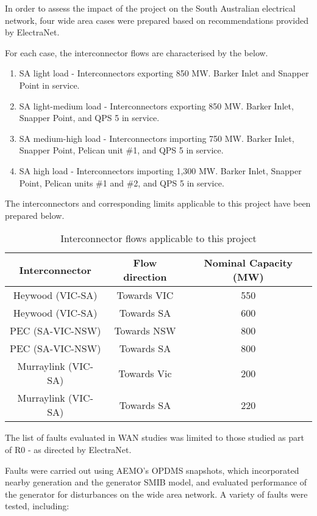 \documentclass{../grid-link-report}
\begin{document}
	In order to assess the impact of the project on the South Australian electrical network, four wide area cases were prepared based on recommendations provided by ElectraNet.
	
	For each case, the interconnector flows are characterised by the below.
	
	\begin{enumerate}
		\item SA light load - Interconnectors exporting 850 MW. Barker Inlet and Snapper Point in service.
		\item SA light-medium load - Interconnectors exporting 850 MW. Barker Inlet, Snapper Point, and QPS 5 in service.
		\item SA medium-high load - Interconnectors importing 750 MW. Barker Inlet, Snapper Point, Pelican unit \#1, and QPS 5 in service.
		\item SA high load - Interconnectors importing 1,300 MW. Barker Inlet, Snapper Point, Pelican units \#1 and \#2, and QPS 5 in service.
	\end{enumerate}
	
	The interconnectors and corresponding limits applicable to this project have been prepared below.
	
	\begin{table}[H]
		\centering
		\begin{tabular}{|c|c|c|}
			\hline
			Interconnector & Flow direction & Nominal Capacity (MW) \\ \hline
			Heywood (VIC-SA) & Towards VIC & 550 \\ \hline
			Heywood (VIC-SA) & Towards SA & 600 \\ \hline
			PEC (SA-VIC-NSW) & Towards NSW & 800 \\ \hline
			PEC (SA-VIC-NSW) & Towards SA & 800 \\ \hline
			Murraylink (VIC-SA) & Towards Vic & 200 \\ \hline
			Murraylink (VIC-SA) & Towards SA & 220 \\ \hline
		\end{tabular}
		\caption{Interconnector flows applicable to this project}
		\label{tab:case-interconnector-flow}
	\end{table}
	The list of faults evaluated in WAN studies was limited to those studied as part of R0 - as directed by ElectraNet.
	
	Faults were carried out using AEMO's OPDMS snapshots, which incorporated nearby generation and the generator SMIB model, and evaluated performance of the generator for disturbances on the wide area network. A variety of faults were tested, including:
	
\end{document}
